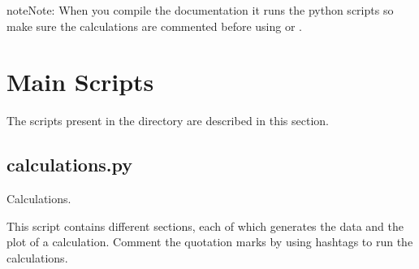 \documentclass[letterpaper,10pt,english]{sphinxmanual}
\begin{document}
\begin{sphinxadmonition}{note}{Note:}
\sphinxAtStartPar
When you compile the documentation it runs the python scripts so make sure
the calculations are commented before using  or .
\end{sphinxadmonition}

\sphinxstepscope


\chapter{Main Scripts}
\label{\detokenize{main_scripts:main-scripts}}\label{\detokenize{main_scripts::doc}}
\sphinxAtStartPar
The scripts present in the  directory are described in this section.


\section{calculations.py}
\label{\detokenize{main_scripts:module-calculations}}\label{\detokenize{main_scripts:calculations-py}}
\sphinxAtStartPar
Calculations.

\sphinxAtStartPar
This script contains different sections, each of which 
generates the data and the plot of a calculation. Comment the quotation
marks by using hashtags to run the calculations.
\end{document}
